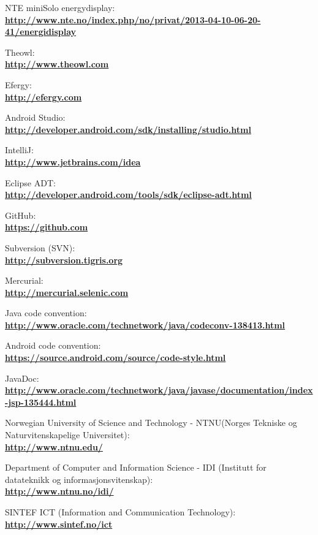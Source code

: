 \begin{thebibliography}{1}
 NTE miniSolo energydisplay:\\
\textbf{ \url{http://www.nte.no/index.php/no/privat/2013-04-10-06-20-41/energidisplay}}

 Theowl:\\
\textbf{ \url{http://www.theowl.com}}


 Efergy:\\
\textbf{ \url{http://efergy.com}}

 Android Studio:\\
\textbf{ \url{http://developer.android.com/sdk/installing/studio.html}}

 IntelliJ:\\
\textbf{ \url{http://www.jetbrains.com/idea}}

 Eclipse ADT:\\
\textbf{ \url{http://developer.android.com/tools/sdk/eclipse-adt.html}}

 GitHub:\\
\textbf{ \url{https://github.com}}

 Subversion (SVN):\\
\textbf{ \url{http://subversion.tigris.org}}

 Mercurial:\\
\textbf{ \url{http://mercurial.selenic.com}}

 Java code convention:\\
\textbf{ \url{http://www.oracle.com/technetwork/java/codeconv-138413.html}}

 Android code convention:\\
\textbf{ \url{https://source.android.com/source/code-style.html}}

 JavaDoc:\\
\textbf{ \url{http://www.oracle.com/technetwork/java/javase/documentation/index-jsp-135444.html}}

 Norwegian University of Science and Technology - NTNU(Norges Tekniske og Naturvitenskapelige Universitet):\\
\textbf{\url{http://www.ntnu.edu/}}

 Department of Computer and Information Science - IDI (Institutt for datateknikk og informasjonsvitenskap):\\
\textbf{ \url{http://www.ntnu.no/idi/}}

 SINTEF ICT (Information and Communication Technology): \\
\textbf{ \url{http://www.sintef.no/ict}}


\end{thebibliography}
